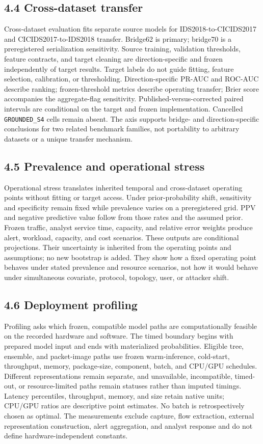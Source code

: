 \documentclass[preprint,12pt]{elsarticle}
\begin{document}
\subsection{4.4 Cross-dataset transfer}
Cross-dataset evaluation fits separate source models for IDS2018-to-CICIDS2017 and CICIDS2017-to-IDS2018 transfer. Bridge62 is primary; bridge70 is a preregistered serialization sensitivity. Source training, validation thresholds, feature contracts, and target cleaning are direction-specific and frozen independently of target results. Target labels do not guide fitting, feature selection, calibration, or thresholding.
Direction-specific PR-AUC and ROC-AUC describe ranking; frozen-threshold metrics describe operating transfer; Brier score accompanies the aggregate-flag sensitivity. Published-versus-corrected paired intervals are conditional on the target and frozen implementation. Cancelled \texttt{GROUNDED\_S4} cells remain absent. The axis supports bridge- and direction-specific conclusions for two related benchmark families, not portability to arbitrary datasets or a unique transfer mechanism.

\subsection{4.5 Prevalence and operational stress}
Operational stress translates inherited temporal and cross-dataset operating points without fitting or target access. Under prior-probability shift, sensitivity and specificity remain fixed while prevalence varies on a preregistered grid. PPV and negative predictive value follow from those rates and the assumed prior. Frozen traffic, analyst service time, capacity, and relative error weights produce alert, workload, capacity, and cost scenarios.
These outputs are conditional projections. Their uncertainty is inherited from the operating points and assumptions; no new bootstrap is added. They show how a fixed operating point behaves under stated prevalence and resource scenarios, not how it would behave under simultaneous covariate, protocol, topology, user, or attacker shift.

\subsection{4.6 Deployment profiling}
Profiling asks which frozen, compatible model paths are computationally feasible on the recorded hardware and software. The timed boundary begins with prepared model input and ends with materialized probabilities. Eligible tree, ensemble, and packet-image paths use frozen warm-inference, cold-start, throughput, memory, package-size, component, batch, and CPU/GPU schedules. Different representations remain separate, and unavailable, incompatible, timed-out, or resource-limited paths remain statuses rather than imputed timings.
Latency percentiles, throughput, memory, and size retain native units; CPU/GPU ratios are descriptive point estimates. No batch is retrospectively chosen as optimal. The measurements exclude capture, flow extraction, external representation construction, alert aggregation, and analyst response and do not define hardware-independent constants.
\end{document}
